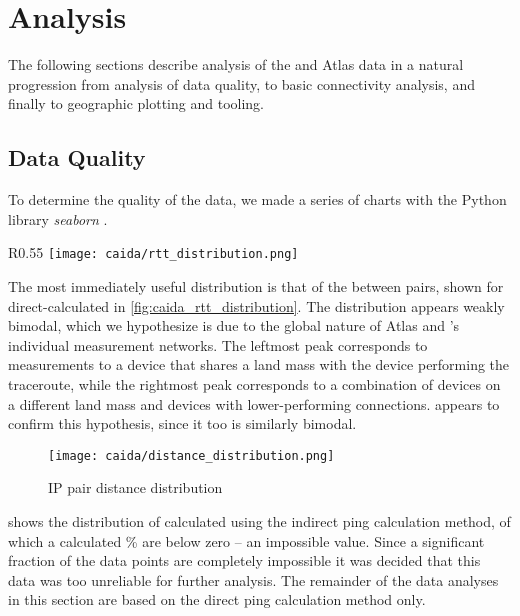 \section{Analysis}\label{sec:caida_results}

The following sections describe analysis of the \caida and \ripe Atlas data in a natural progression from analysis of data quality, to basic connectivity analysis, and finally to geographic plotting and \gis tooling.

\subsection{Data Quality}\label{sec:caida_data_quality}

To determine the quality of the data, we made a series of \kde charts with the Python library \textit{seaborn} \cite{seaborn}. 

\begin{wrapfigure}[18]{R}{0.55\textwidth}
    \centering
    \texttt{[image: caida/rtt\_distribution.png]}
    \caption{RTT distribution, direct ping calculation}
    \label{fig:caida_rtt_distribution}
\end{wrapfigure}

The most immediately useful distribution is that of the \rtt between \ip pairs, shown for direct-calculated \rtts in \cref{fig:caida_rtt_distribution}. The distribution appears weakly bimodal, which we hypothesize is due to the global nature of \ripe Atlas and \caida's individual measurement networks. The leftmost peak corresponds to measurements to a device that shares a land mass with the device performing the traceroute, while the rightmost peak corresponds to a combination of devices on a different land mass and devices with lower-performing connections.  appears to confirm this hypothesis, since it too is similarly bimodal.

\begin{figure}
    \centering
    \texttt{[image: caida/distance\_distribution.png]}
    \caption{IP pair distance distribution}
    \label{fig:caida_distance_distribution}
\end{figure}

  shows the distribution of \rtts calculated using the indirect ping calculation method, of which a calculated \% are below zero -- an impossible value. Since a significant fraction of the data points are completely impossible it was decided that this data was too unreliable for further analysis. The remainder of the data analyses in this section are based on the direct ping calculation method only.

